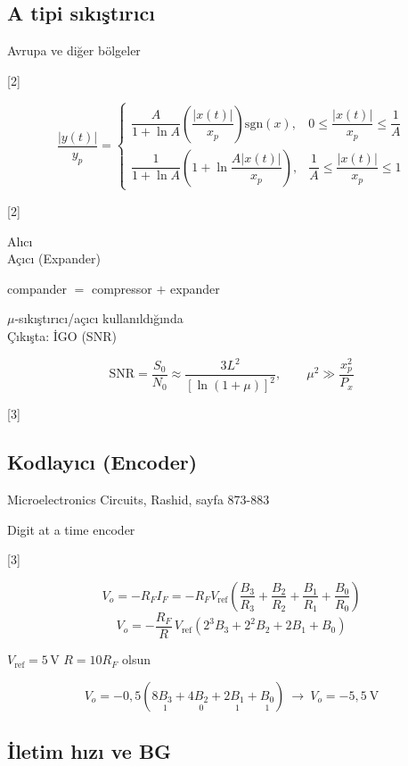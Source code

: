 \documentclass[11pt,a4paper]{article}
\begin{document}
\subsection{A tipi sıkıştırıcı}
Avrupa ve diğer bölgeler

[2]

\[ \frac{|y(t)|}{y_p}=\begin{cases} \dfrac{A}{1+\ln A}\left(\dfrac{|x(t)|}{x_p}\right)\mathrm{sgn}(x), & 0\le\dfrac{|x(t)|}{x_p}\le\dfrac{1}{A}\\[3mm] \dfrac{1}{1+\ln A}\left(1+\ln\dfrac{A|x(t)|}{x_p}\right), & \dfrac{1}{A}\le\dfrac{|x(t)|}{x_p}\le 1 \end{cases} \]


[2]

Alıcı\\
Açıcı (Expander)

compander $=$ compressor $+$ expander

$\mu$-sıkıştırıcı/açıcı kullanıldığında\\
Çıkışta: İGO (SNR)

\[ \mathrm{SNR}=\frac{S_0}{N_0}\approx\frac{3L^2}{\left[\ln(1+\mu)\right]^2},\qquad \mu^2\gg\frac{x_p^2}{P_x} \]

[3]

\subsection{Kodlayıcı (Encoder)}
Microelectronics Circuits, Rashid, sayfa 873-883

Digit at a time encoder

[3]

\[ V_o=-R_F I_F=-R_F V_{\mathrm{ref}}\left(\frac{B_3}{R_3}+\frac{B_2}{R_2}+\frac{B_1}{R_1}+\frac{B_0}{R_0}\right) \]
\[ V_o=-\frac{R_F}{R}\,V_{\mathrm{ref}}\left(2^3B_3+2^2B_2+2B_1+B_0\right) \]

$V_{\mathrm{ref}}=5\,\mathrm{V}$ \quad $R=10R_F$ olsun

\[ V_o=-0{,}5\left(8\underset{1}{B_3}+4\underset{0}{B_2}+2\underset{1}{B_1}+\underset{1}{B_0}\right)\ \longrightarrow\ V_o=-5{,}5\ \mathrm{V} \]

\subsection{İletim hızı ve BG}
\end{document}
